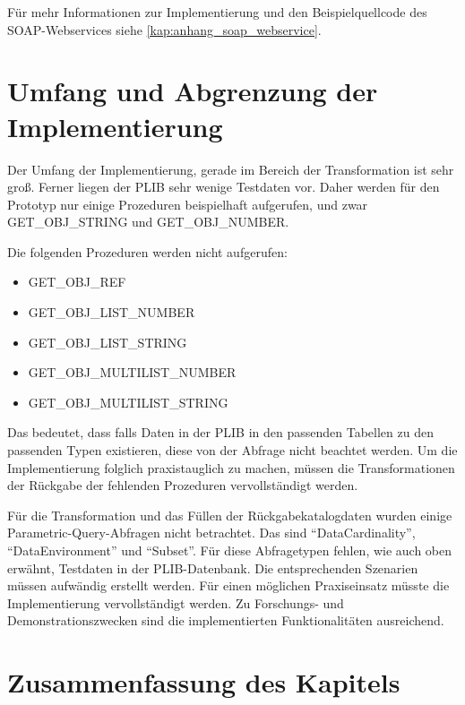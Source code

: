 Für mehr Informationen zur Implementierung und den Beispielquellcode des \gls{SOAP}-\glspl{Webservice} siehe \autoref{kap:anhang_soap_webservice}. 

\section{Umfang und Abgrenzung der Implementierung}

Der Umfang der Implementierung, gerade im Bereich der Transformation ist sehr groß. Ferner liegen der \gls{PLIB} sehr wenige Testdaten vor. Daher werden für den Prototyp nur einige Prozeduren beispielhaft aufgerufen, und zwar GET\_OBJ\_STRING und GET\_OBJ\_NUMBER. 

Die folgenden Prozeduren werden nicht aufgerufen: 
\begin{multicols}{2}
\begin{itemize}
\item GET\_OBJ\_REF
\item GET\_OBJ\_LIST\_NUMBER
\item GET\_OBJ\_LIST\_STRING
\item GET\_OBJ\_MULTILIST\_NUMBER
\item GET\_OBJ\_MULTILIST\_STRING
\end{itemize}
\end{multicols}
Das bedeutet, dass falls Daten in der \gls{PLIB} in den passenden Tabellen zu den passenden Typen existieren, diese von der Abfrage nicht beachtet werden. Um die Implementierung folglich praxistauglich zu machen, müssen die Transformationen der Rückgabe der fehlenden Prozeduren vervollständigt werden. 

Für die Transformation und das Füllen der Rückgabekatalogdaten wurden einige Para\-metric-Query-Abfragen nicht betrachtet. Das sind \enquote{DataCardinality}, \enquote{DataEnvironment} und \enquote{Subset}. Für diese Abfragetypen fehlen, wie auch oben erwähnt, Testdaten in der \gls{PLIB}-Datenbank. Die entsprechenden Szenarien müssen aufwändig erstellt werden. Für einen möglichen Praxiseinsatz müsste die Implementierung vervollständigt werden. Zu Forschungs- und Demonstrationszwecken sind die implementierten Funktionalitäten ausreichend. 
 
\section{Zusammenfassung des Kapitels}


